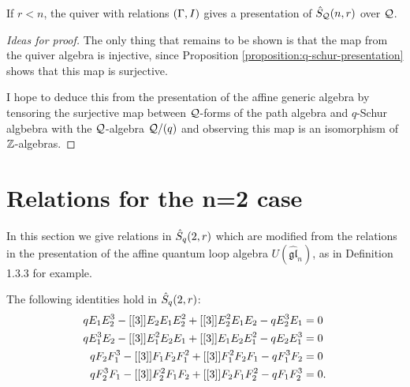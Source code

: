 \documentclass[a4paper, 11pt, twoside]{report}
\begin{document}
\begin{conjecture}
If $r<n$, the quiver with relations $(\Gamma,\qrelations)$ gives a presentation of $\Qqschur$ over $\qfrac$.
\end{conjecture}

\begin{proof}[Ideas for proof]
The only thing that remains to be shown is that the map from the quiver algebra is injective, since Proposition \ref{proposition:q-schur-presentation} shows that this map is surjective.

I hope to deduce this from the presentation of the affine generic algebra by tensoring the surjective map between $\qfrac$-forms of the path algebra and $q$-Schur algbebra with the $\qfrac$-algebra $\qfrac/{(q)}$ and observing this map is an isomorphism of $\integers$-algebras.
\end{proof}


\section{Relations for the n=2 case}

In this section we give relations in $\qschur[2,r]$ which are modified from the relations in the presentation of the affine quantum loop algebra $U(\hat{\mathfrak{gl}}_n)$, as in Definition 1.3.3 \cite{deng12book} for example.

\begin{lemma}\label{lemma:period-2-q-relations}
The following identities hold in $\qschur[2,r]$:
\begin{align*}
qE_1 E_2^3 -\qint{3}E_2 E_1 E_2^2 +\qint{3}E_2^2 E_1 E_2 -qE_2^3 E_1 &= 0\\
qE_1^3 E_2 -\qint{3}E_1^2 E_2 E_1 +\qint{3}E_1 E_2 E_1^2 -qE_2 E_1^3 &= 0\\
qF_2 F_1^3 -\qint{3}F_1 F_2 F_1^2 +\qint{3}F_1^2 F_2 F_1 -qF_1^3 F_2 &= 0\\
qF_2^3 F_1 -\qint{3}F_2^2 F_1 F_2 +\qint{3}F_2 F_1 F_2^2 -qF_1 F_2^3 &= 0.
\end{align*}
\end{lemma}
\end{document}
